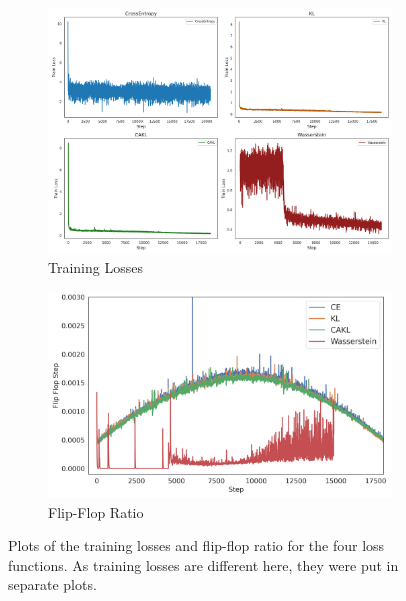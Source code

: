 \documentclass{article}
\begin{document}
\begin{figure}[ht]
  \centering
  \begin{subfigure}[b]{0.45\textwidth}
    \includegraphics[width=\linewidth]{../data/plots/loss_comparison_grid.png}
    \caption{Training Losses}
  \end{subfigure}
  \hfill
  \begin{subfigure}[b]{0.45\textwidth}
    \includegraphics[width=\linewidth]{../data/plots/quant_loss_ff.png}
    \caption{Flip-Flop Ratio}
  \end{subfigure}
  \caption{Plots of the training losses and flip-flop ratio for the four loss functions. As training losses are different here, they were put in separate plots.}
  \label{fig:loss}
\end{figure}
\end{document}
